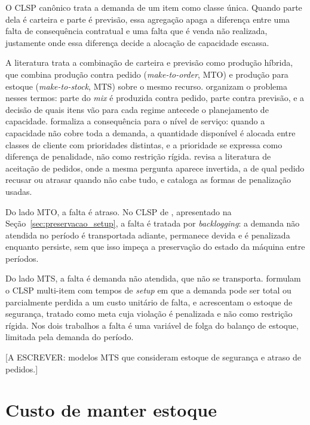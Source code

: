 \documentclass[
    12pt,
    openright,
    oneside,
    a4paper,
    fleqn,
    chapter=TITLE,
    section=TITLE,
    english,
    brazil
]{abntex2}
\begin{document}
O CLSP canônico trata a demanda de um item como classe única. Quando parte dela é carteira e parte é previsão, essa agregação apaga a diferença entre uma falta de consequência contratual e uma falta que é venda não realizada, justamente onde essa diferença decide a alocação de capacidade escassa.

A literatura trata a combinação de carteira e previsão como produção híbrida, que combina produção contra pedido (\textit{make-to-order}, MTO) e produção para estoque (\textit{make-to-stock}, MTS) sobre o mesmo recurso.  organizam o problema nesses termos: parte do \textit{mix} é produzida contra pedido, parte contra previsão, e a decisão de quais itens vão para cada regime antecede o planejamento de capacidade.  formaliza a consequência para o nível de serviço: quando a capacidade não cobre toda a demanda, a quantidade disponível é alocada entre classes de cliente com prioridades distintas, e a prioridade se expressa como diferença de penalidade, não como restrição rígida.  revisa a literatura de aceitação de pedidos, onde a mesma pergunta aparece invertida, a de qual pedido recusar ou atrasar quando não cabe tudo, e cataloga as formas de penalização usadas.

Do lado MTO, a falta é atraso. No CLSP de , apresentado na Seção~\ref{sec:preservacao_setup}, a falta é tratada por \textit{backlogging}: a demanda não atendida no período é transportada adiante, permanece devida e é penalizada enquanto persiste, sem que isso impeça a preservação do estado da máquina entre períodos.

Do lado MTS, a falta é demanda não atendida, que não se transporta.  formulam o CLSP multi-item com tempos de \textit{setup} em que a demanda pode ser total ou parcialmente perdida a um custo unitário de falta, e  acrescentam o estoque de segurança, tratado como meta cuja violação é penalizada e não como restrição rígida. Nos dois trabalhos a falta é uma variável de folga do balanço de estoque, limitada pela demanda do período.

[A ESCREVER: modelos MTS que consideram estoque de segurança e atraso de pedidos.]

\section{Custo de manter estoque}
\label{sec:custo_estoque}
\end{document}
